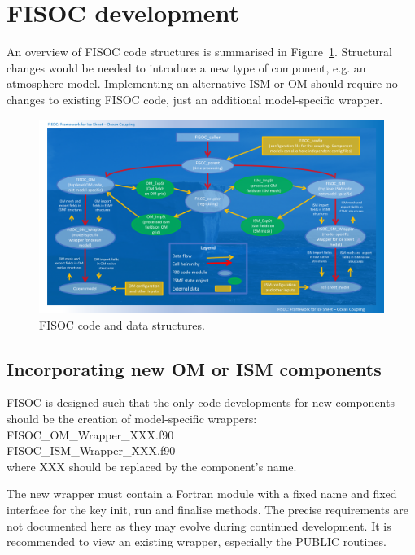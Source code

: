 \documentclass[12pt]{article}
\begin{document}
\section{FISOC development}
\label{sec:FISOC_SDG}

An overview of FISOC code structures is summarised 
in Figure~\ref{fig:codeStruct}.  
Structural changes would be needed to introduce a new type 
of component, e.g. an atmosphere model.
Implementing an alternative ISM or OM should require no changes 
to existing FISOC code, just an additional model-specific wrapper.

\begin{figure}[t]
  \vspace*{2mm}
  \begin{center}
    \includegraphics[width=17cm]{FISOC_structure2.pdf}
  \end{center}
  \caption{FISOC code and data structures.}
  \label{fig:codeStruct}
\end{figure}



\subsection{Incorporating new OM or ISM components}

FISOC is designed such that the only code developments for new components should be the creation 
of model-specific wrappers: \\
FISOC\_OM\_Wrapper\_XXX.f90 \\
 FISOC\_ISM\_Wrapper\_XXX.f90 \\
where XXX should be replaced by the component's name.

The new wrapper must contain a Fortran module with a fixed name 
and fixed interface for the key init, run and finalise methods. 
The precise requirements are not documented here as they may evolve 
during continued development.  
It is recommended to view an existing wrapper, especially the 
PUBLIC routines.
\end{document}
